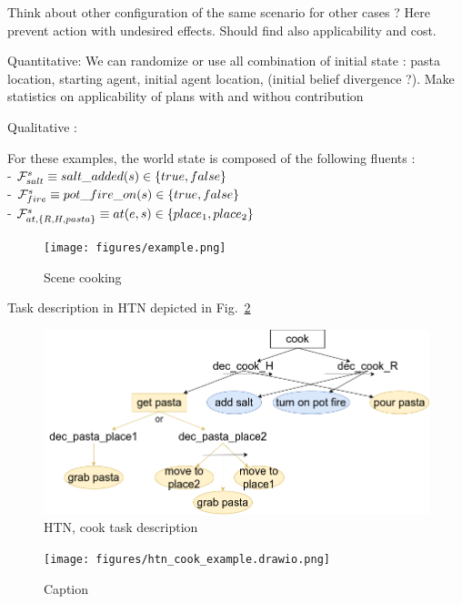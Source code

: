 \documentclass[letterpaper]{article} %
\begin{document}
Think about other configuration of the same scenario for other cases ? Here prevent action with undesired effects. Should find also applicability and cost.

Quantitative: We can randomize or use all combination of initial state : pasta location, starting agent, initial agent location, (initial belief divergence ?). Make statistics on applicability of plans with and withou contribution 

Qualitative :

For these examples, the world state is composed of the following fluents :\\
- $\mathcal{F}^{s}_{salt} \equiv salt\_added(s)\in\{true, false\}$\\
- $\mathcal{F}^{s}_{fire} \equiv pot\_fire\_on(s)\in\{true, false\}$\\
- $\mathcal{F}^{s}_{at, \{R,H,pasta\} } \equiv at(e, s)\in \{place_1, place_2\}$

\begin{figure}
    \centering
    \texttt{[image: figures/example.png]}
    \caption{Scene cooking}
    \label{fig:scene}
\end{figure}

Task description in HTN depicted in Fig.~\ref{fig:htn}

\begin{figure}
    \centering
    \includegraphics[width=\linewidth]{figures/htn.png}
    \caption{HTN, cook task description}
    \label{fig:htn}
\end{figure}

\begin{figure}
    \centering
    \texttt{[image: figures/htn\_cook\_example.drawio.png]}
    \caption{Caption}
    \label{fig:scenarios}
\end{figure}
\end{document}

